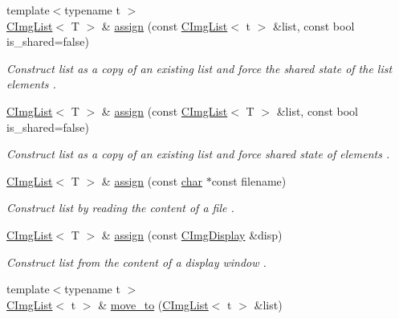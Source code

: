 \begin{DoxyCompactItemize}
{\footnotesize template$<$typename t $>$ }\\\hyperlink{structcimg__library__suffixed_1_1CImgList}{C\+Img\+List}$<$ T $>$ \& \hyperlink{structcimg__library__suffixed_1_1CImgList_aea8246a41cbc6f014e3a44757bdae0ec}{assign} (const \hyperlink{structcimg__library__suffixed_1_1CImgList}{C\+Img\+List}$<$ t $>$ \&list, const bool is\+\_\+shared=false)
\begin{DoxyCompactList}\small\item\em Construct list as a copy of an existing list and force the shared state of the list elements . \end{DoxyCompactList}\item 
\mbox{\label{structcimg__library__suffixed_1_1CImgList_ab896c4f7d87bc33821231b37dd85f79e}} 
\hyperlink{structcimg__library__suffixed_1_1CImgList}{C\+Img\+List}$<$ T $>$ \& \hyperlink{structcimg__library__suffixed_1_1CImgList_ab896c4f7d87bc33821231b37dd85f79e}{assign} (const \hyperlink{structcimg__library__suffixed_1_1CImgList}{C\+Img\+List}$<$ T $>$ \&list, const bool is\+\_\+shared=false)
\begin{DoxyCompactList}\small\item\em Construct list as a copy of an existing list and force shared state of elements  . \end{DoxyCompactList}\item 
\hyperlink{structcimg__library__suffixed_1_1CImgList}{C\+Img\+List}$<$ T $>$ \& \hyperlink{structcimg__library__suffixed_1_1CImgList_aef5377b65794d5457dbc90b340e76530}{assign} (const \hyperlink{classchar}{char} $\ast$const filename)
\begin{DoxyCompactList}\small\item\em Construct list by reading the content of a file . \end{DoxyCompactList}\item 
\hyperlink{structcimg__library__suffixed_1_1CImgList}{C\+Img\+List}$<$ T $>$ \& \hyperlink{structcimg__library__suffixed_1_1CImgList_ad0c3f5457500c8ca681b6e57c8884b35}{assign} (const \hyperlink{structcimg__library__suffixed_1_1CImgDisplay}{C\+Img\+Display} \&disp)
\begin{DoxyCompactList}\small\item\em Construct list from the content of a display window . \end{DoxyCompactList}\item 
{\footnotesize template$<$typename t $>$ }\\\hyperlink{structcimg__library__suffixed_1_1CImgList}{C\+Img\+List}$<$ t $>$ \& \hyperlink{structcimg__library__suffixed_1_1CImgList_aa70386a8220b072cfebd654cb1ea636a}{move\+\_\+to} (\hyperlink{structcimg__library__suffixed_1_1CImgList}{C\+Img\+List}$<$ t $>$ \&list)

\end{DoxyCompactItemize}
